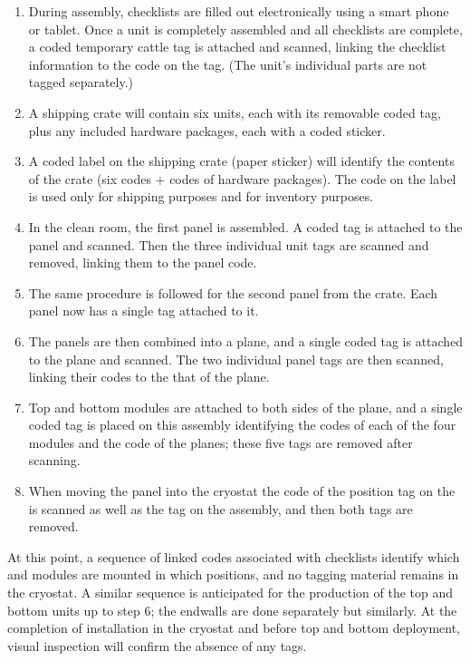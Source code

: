 \begin{enumerate}
\item During assembly,  checklists are filled out electronically using a smart phone or tablet.  Once a  unit 
is completely assembled and all checklists are complete, a coded temporary cattle tag is attached and scanned, linking the checklist information to the code on the tag. (The  unit's individual parts are not tagged separately.)
\item 
A shipping crate will contain six %
 units, each with its removable coded tag, plus any included hardware packages, each with a coded sticker.
\item A coded label on the shipping crate (paper sticker) will %
identify the contents of the crate (six codes + codes of hardware packages). The code on the label is used only for shipping purposes and for inventory purposes.  %
\item In the \surf clean room, the first  panel is assembled. A coded tag is attached to the  panel and scanned.  Then the three individual  unit tags are scanned and removed, linking them to the  panel code.
\item The same procedure is followed for the second  panel from the crate.  Each  panel now has a single tag attached to it.
\item The %
 panels are then combined into a  plane, and a single coded tag is attached to the  plane and scanned. %
The two individual  panel tags are then scanned, linking their codes to the that of the  plane. %
\item Top and bottom  modules 
are attached to both sides of the  plane, and  a single coded tag is placed on this  assembly identifying the codes of each of the four  modules %
and the code of the  planes;  %
these five tags are removed after scanning.  
\item When moving the panel into the cryostat the code of the position tag on the  is scanned as well as the tag on the  assembly, and then both tags %
are removed.
\end{enumerate}
At this point, %
a sequence of linked codes associated with  checklists %
identify which  and  modules %
are mounted in %
which  positions, and no tagging material remains in the cryostat.  A similar sequence is anticipated for the production of the  top and bottom units up to step 6; the endwalls are done separately but similarly.  
At the completion of installation in the cryostat and before  top and bottom deployment, visual inspection will confirm the absence of any tags.

